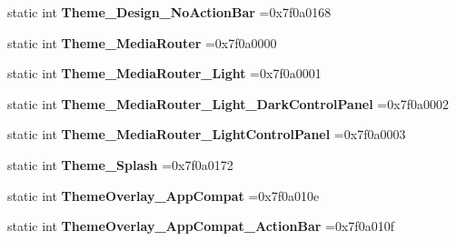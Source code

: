 \begin{DoxyCompactItemize}
static int {\bfseries Theme\+\_\+\+Design\+\_\+\+No\+Action\+Bar} =0x7f0a0168
\item 
\mbox{\label{classandroid_1_1support_1_1v7_1_1recyclerview_1_1R_1_1style_aa0f2a7e01b965c4a6fca1c2d115548fb}} 
static int {\bfseries Theme\+\_\+\+Media\+Router} =0x7f0a0000
\item 
\mbox{\label{classandroid_1_1support_1_1v7_1_1recyclerview_1_1R_1_1style_a0ed14065994407cc8d812261ba0dd655}} 
static int {\bfseries Theme\+\_\+\+Media\+Router\+\_\+\+Light} =0x7f0a0001
\item 
\mbox{\label{classandroid_1_1support_1_1v7_1_1recyclerview_1_1R_1_1style_ad23c919088eaae0b50deda4c4cf2ff17}} 
static int {\bfseries Theme\+\_\+\+Media\+Router\+\_\+\+Light\+\_\+\+Dark\+Control\+Panel} =0x7f0a0002
\item 
\mbox{\label{classandroid_1_1support_1_1v7_1_1recyclerview_1_1R_1_1style_ad5f6ff06b46e1d5309990f3b69910835}} 
static int {\bfseries Theme\+\_\+\+Media\+Router\+\_\+\+Light\+Control\+Panel} =0x7f0a0003
\item 
\mbox{\label{classandroid_1_1support_1_1v7_1_1recyclerview_1_1R_1_1style_a1d26c7849c5efb5d4703fbbc863e20c1}} 
static int {\bfseries Theme\+\_\+\+Splash} =0x7f0a0172
\item 
\mbox{\label{classandroid_1_1support_1_1v7_1_1recyclerview_1_1R_1_1style_a7b3fccf91d2e6dd5a7d6264862fb2b97}} 
static int {\bfseries Theme\+Overlay\+\_\+\+App\+Compat} =0x7f0a010e
\item 
\mbox{\label{classandroid_1_1support_1_1v7_1_1recyclerview_1_1R_1_1style_a4a0f9c09be4ee617673645eb7b23c327}} 
static int {\bfseries Theme\+Overlay\+\_\+\+App\+Compat\+\_\+\+Action\+Bar} =0x7f0a010f
\item 
\mbox{\label{classandroid_1_1support_1_1v7_1_1recyclerview_1_1R_1_1style_ad3281b0fc3dd0dc753a77a47a848fed1}} 

\end{DoxyCompactItemize}
